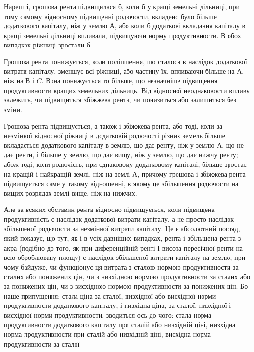 \noindent{}Нарешті, грошова рента підвищилася б, коли б у кращі земельні дільниці,
при тому самому відносному підвищенні родючости, вкладено було більше
додаткового капіталу, ніж у землю $А$, або коли б додаткові вкладання капіталу в кращі
земельні дільниці впливали, підвищуючи норму продуктивности. В обох випадках
ріжниці зростали б.

Грошова рента понижується, коли поліпшення, що сталося в наслідок
додаткової витрати капіталу, зменшує всі ріжниці, або частину їх, впливаючи
більше на $А$, ніж на $В$ і $C$. Вона понижується то більше, що незначніше
підвищення продуктивности кращих земельних дільниць. Від відносної неоднаковости
впливу залежить, чи підвищиться збіжжева рента, чи понизиться або
залишиться без зміни.

Грошова рента підвищується, а також і збіжжева рента, або тоді, коли за
незмінної відносної ріжниці в додатковій родючості різних земель більше вкладається
додаткового капіталу в землю, що дає ренту, ніж у землю $А$, що не дає
ренти, і більше у землю, що дає вищу, ніж у землю, що дає нижчу ренту;
абож тоді, коли родючість, при однаковому додатковому капіталі, більше зростає
на кращій і найкращій землі, ніж на землі $А$, причому грошова і збіжжева
рента підвищується саме у такому відношенні, в якому це збільшення родючости
на вищих розрядах землі вище, ніж на нижчих.

Але за всяких обставин рента відносно підвищується, коли підвищена продуктивність
є наслідок додаткової витрати капіталу, а не просто наслідок
збільшеної родючости за незмінної витрати капіталу. Це є абсолютний погляд,
який показує, що тут, як і в усіх давніших випадках, рента і збільшена рента з акра
(подібно до того, як при диференційній ренті І висота пересічної ренти на всю
оброблювану площу) є наслідок збільшеної витрати капіталу на землю, при
чому байдуже, чи функціонує ця витрата з сталою нормою продуктивности за
сталих або понижених цін, чи з низхідною нормою продуктивности за сталих або
за понижених цін, чи з висхідною нормою продуктивности за понижених цін.
Бо наше припущення: стала ціна за сталої, низхідної або висхідної норми продуктивности додаткового
капіталу, і низхідна ціна, за сталої, низхідної і висхідної
норми продуктивности, зводиться ось до чого: стала норма продуктивности додаткового капіталу при
сталій або низхідній ціні, низхідна норма продуктивности
при сталій або низхідній ціні, висхідна норма продуктивности за сталої
\parbreak{}  %
